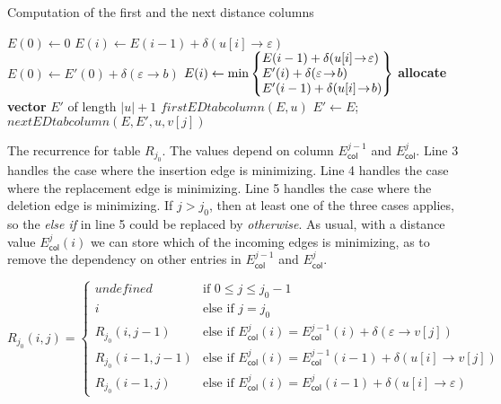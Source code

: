 \documentclass[12pt,a4paper]{scrartcl}
\newcommand{\Eop}[3][\!]{#2#1\to#1#3}
\newcommand{\Assign}[2]{\mbox{$#1\leftarrow #2$}}
\newcommand{\Size}[1]{|#1|}
\newcommand{\Upto}[0]{\textbf{upto}\xspace}
\newcommand{\Subchar}[2]{#1[#2]}
\newcommand{\Rtab}[1][j_{0}]{R_{#1}}
\newcommand{\EDcol}[1]{E_{\mathsf{col}}^{#1}}
\newcommand{\Deletion}[2][\!]{\Eop[#1]{#2}{\varepsilon}}
\newcommand{\Insertion}[2][\!]{\Eop[#1]{\varepsilon}{#2}}
\newcommand{\Replacement}[3][\!]{\Eop[#1]{#2}{#3}}
\begin{document}
\begin{algorithm}
\caption{Computation of the first and the next distance columns}
\label{FirstNextEDtabcolumn}
\begin{algorithmic}[1]
  \State \Assign{E(0)}{0}
  \For{\Assign{i}{1} \Upto \(\Size{u}\)} %
               \Assign{E(i)}{E(i-1)+\delta(\Eop{\Subchar{u}{i}}{\varepsilon})}
  \EndFor
\EndFunction
{}%
  \State \Assign{E(0)}{E'(0)+\delta(\Eop{\varepsilon}{b})}
  \For{\Assign{i}{1} \Upto \(\Size{u}\)} %
     \Assign{E(i)}{\min\left\{\begin{array}{@{}l@{}}
                 E(i-1)+\delta(\Eop{\Subchar{u}{i}}{\varepsilon})\\
                 E'(i)+\delta(\Eop{\varepsilon}{b})\\
                 E'(i-1)+\delta(\Eop{\Subchar{u}{i}}{b})\end{array}\right\}}
  \EndFor
\EndFunction
{}%
\State \textbf{allocate vector} \(E'\) of length \(\Size{u}+1\)
\State \(\mathit{firstEDtabcolumn}(E,u)\)
\For{\Assign{j}{1} \Upto \(\Size{v}\)} %
  \Assign{E'}{E}; \(\mathit{nextEDtabcolumn}(E,E',u,\Subchar{v}{j})\)
\EndFor
\EndFunction
\end{algorithmic}
\end{algorithm}

\begin{algorithm}
\caption{The recurrence for table \(\Rtab\). The values depend on
column \(\EDcol{j-1}\) and \(\EDcol{j}\). Line 3 handles the
case where the insertion edge is minimizing. Line 4 handles the case where the
replacement edge is minimizing. Line 5 handles the case where the deletion
edge is minimizing. If \(j>j_{0}\), then at least one of the three cases
applies, so the \textit{else if} in line 5 could be replaced by
\textit{otherwise}. As usual, with a distance value \(\EDcol{j}(i)\)
we can store which of the incoming edges is minimizing, as to remove the
dependency on other entries in \(\EDcol{j-1}\) and \(\EDcol{j}\).}%
\label{Rtabrecurrence}
\[\Rtab(i,j)=\begin{cases}
\mathit{undefined}&\text{if }0\leq j\leq j_{0}-1\\
i&\text{else if }j=j_{0}\\
\Rtab(i,j-1)&\text{else if }\EDcol{j}(i)=\EDcol{j-1}(i)+\delta(\Insertion{\Subchar{v}{j}})\\
\Rtab(i-1,j-1)&\text{else if }\EDcol{j}(i)=\EDcol{j-1}(i-1)+\delta(\Replacement{\Subchar{u}{i}}{\Subchar{v}{j}})\\
\Rtab(i-1,j)&\text{else if }\EDcol{j}(i)=\EDcol{j}(i-1)+\delta(\Deletion{\Subchar{u}{i}})
\end{cases}
\]
\end{algorithm}
\end{document}

